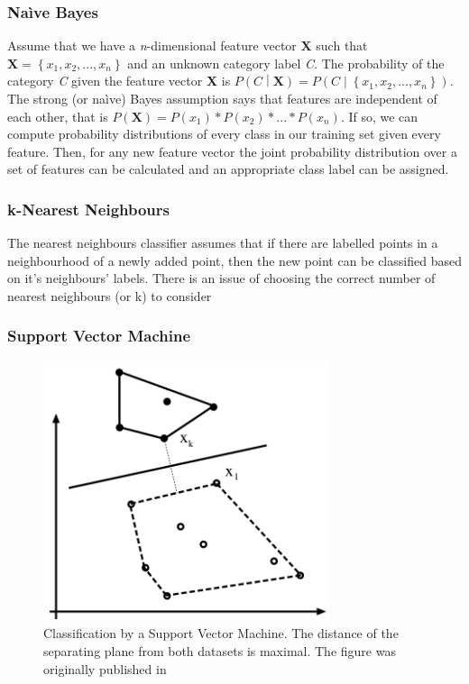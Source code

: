 	\subsubsection{Na\`ive Bayes}
	Assume that we have a \textit{n}-dimensional feature vector $\mathbf{X}$ such that $\mathbf{X} = \left\{x_1, x_2, ... , x_\mathit{n}\right\}$ and an unknown category label \textit{C}. The probability of the category \textit{C} given the feature vector \textbf{X} is $P\left(\mathit{C}\middle|\mathbf{X}\right) = P\left(\mathit{C}\middle|\left\{x_1, x_2, ..., x_\mathit{n}\right\}\right)$. The strong (or na\`ive) Bayes assumption says that features are independent of each other, that is $P(\mathbf{X}) = P(x_1)*P(x_2)*...*P(x_\mathit{n})$. If so, we can compute probability distributions of every class in our training set given every feature. Then, for any new feature vector the joint probability distribution over a set of features can be calculated and an appropriate class label can be assigned.
	
	\subsubsection{k-Nearest Neighbours}
	The nearest neighbours classifier assumes that if there are labelled points in a neighbourhood of a newly added point, then the new point can be classified based on it's neighbours' labels. There is an issue of choosing the correct number of nearest neighbours (or k) to consider
	
	
	\subsubsection{Support Vector Machine}
	\begin{figure}[!ht]
	\centering
	\includegraphics[width=0.75\textwidth]{figs/svm}
	\caption{Classification by a Support Vector Machine. The distance of the separating plane from both datasets is maximal. The figure was originally published in \cite{ponce2011cv}}
	\label{fig:svm}
	\end{figure}
	
